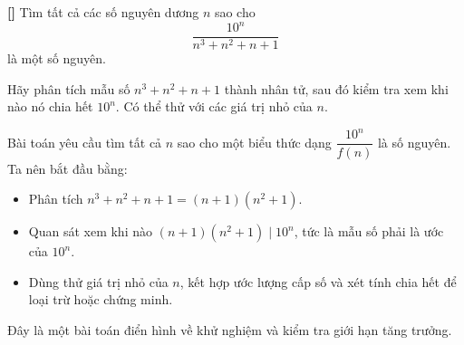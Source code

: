 \documentclass[../01-divisibility.tex]{subfiles}
\begin{document}
\begin{exercise*}\label{example:JPN-2015-MO-P1}\textbf{[]}
	Tìm tất cả các số nguyên dương \( n \) sao cho 
	\[
		\frac{10^n}{n^3 + n^2 + n + 1}
	\]
	là một số nguyên.
\end{exercise*}

\begin{remark*}
    Hãy phân tích mẫu số \( n^3 + n^2 + n + 1 \) thành nhân tử, sau đó kiểm tra xem khi nào nó chia hết \( 10^n \). Có thể thử với các giá trị nhỏ của \( n \).
\end{remark*}

\begin{story*}
    Bài toán yêu cầu tìm tất cả \( n \) sao cho một biểu thức dạng \( \dfrac{10^n}{f(n)} \) là số nguyên.
    Ta nên bắt đầu bằng:
    \begin{itemize}[topsep=0pt, partopsep=0pt, itemsep=0pt]
        \item Phân tích \( n^3 + n^2 + n + 1 = (n + 1)(n^2 + 1) \).
        \item Quan sát xem khi nào \( (n + 1)(n^2 + 1) \mid 10^n \), tức là mẫu số phải là ước của \( 10^n \).
        \item Dùng thử giá trị nhỏ của \( n \), kết hợp ước lượng cấp số và xét tính chia hết để loại trừ hoặc chứng minh.
    \end{itemize}
    Đây là một bài toán điển hình về khử nghiệm và kiểm tra giới hạn tăng trưởng.
\end{story*}
\end{document}
